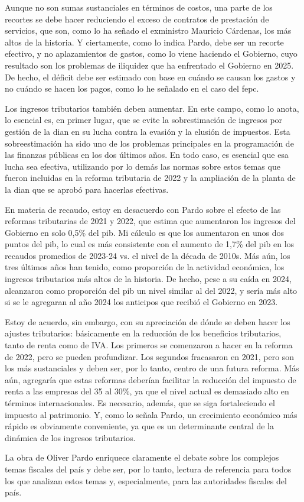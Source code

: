 \begin{prologo}
Aunque no son sumas sustanciales en términos de costos, una parte de los recortes se debe hacer reduciendo el exceso de contratos de prestación de servicios, que son, como lo ha señado el exministro Mauricio Cárdenas, los más altos de la historia. Y ciertamente, como lo indica Pardo, debe ser un recorte efectivo, y no aplazamientos de gastos, como lo viene haciendo el Gobierno, cuyo resultado son los problemas de iliquidez que ha enfrentado el Gobierno en 2025. De hecho, el déficit debe ser estimado con base en cuándo se causan los gastos y no cuándo se hacen los pagos, como lo he señalado en el caso del \gls{fepc}.

Los ingresos tributarios también deben aumentar. En este campo, como lo anota, lo esencial es, en primer lugar, que se evite la sobrestimación de ingresos por gestión de la \gls{dian} en su lucha contra la evasión y la elusión de impuestos. Esta sobreestimación ha sido uno de los problemas principales en la programación de las finanzas públicas en los dos últimos años. En todo caso, es esencial que esa lucha sea efectiva, utilizando por lo demás las normas sobre estos temas que fueron incluidas en la reforma tributaria de 2022 y la ampliación de la planta de la \gls{dian} que se aprobó para hacerlas efectivas.

En materia de recaudo, estoy en desacuerdo con Pardo sobre el efecto de las reformas tributarias de 2021 y 2022, que estima que aumentaron los ingresos del Gobierno en solo 0,5\% del \gls{pib}. Mi cálculo es que los aumentaron en unos dos puntos del \gls{pib}, lo cual es más consistente con el aumento de 1,7\% del \gls{pib} en los recaudos promedios de 2023-24 vs. el nivel de la década de 2010s. Más aún, los tres últimos años han tenido, como proporción de la actividad económica, los ingresos tributarios más altos de la historia. De hecho, pese a su caída en 2024, alcanzaron como proporción del \gls{pib} un nivel similar al del 2022, y sería más alto si se le agregaran al año 2024 los anticipos que recibió el Gobierno en 2023.

Estoy de acuerdo, sin embargo, con su apreciación de dónde se deben hacer los ajustes tributarios: básicamente en la reducción de los beneficios tributarios, tanto de renta como de IVA. Los primeros se comenzaron a hacer en la reforma de 2022, pero se pueden profundizar. Los segundos fracasaron en 2021, pero son los más sustanciales y deben ser, por lo tanto, centro de una futura reforma. Más aún, agregaría que estas reformas deberían facilitar la reducción del impuesto de renta a las empresas del 35 al 30\%, ya que el nivel actual es demasiado alto en términos internacionales. Es necesario, además, que se siga fortaleciendo el impuesto al patrimonio. Y, como lo señala Pardo, un crecimiento económico más rápido es obviamente conveniente, ya que es un determinante central de la dinámica de los ingresos tributarios.

La obra de Oliver Pardo enriquece claramente el debate sobre los complejos temas fiscales del país y debe ser, por lo tanto, lectura de referencia para todos los que analizan estos temas y, especialmente, para las autoridades fiscales del país.

\end{prologo}
